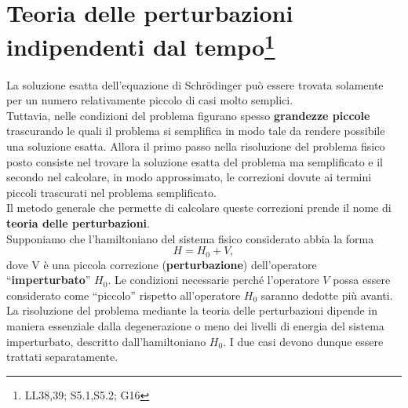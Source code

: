 \chapter[T.d.P. indipendenti dal tempo]{Teoria delle perturbazioni indipendenti dal tempo\footnote{LL38,39; S5.1,S5.2; G16}}
La soluzione esatta dell'equazione di Schr\"{o}dinger può essere trovata solamente per un numero relativamente piccolo di casi molto semplici.\\
Tuttavia, nelle condizioni del problema figurano spesso \textbf{grandezze piccole} trascurando le quali il problema si semplifica in modo tale da rendere possibile una soluzione esatta. Allora il primo passo nella risoluzione del problema fisico posto consiste nel trovare la soluzione esatta del problema ma semplificato e il secondo nel calcolare, in modo approssimato, le correzioni dovute ai termini piccoli trascurati nel problema semplificato.\\
Il metodo generale che permette di calcolare queste correzioni prende il nome di \textbf{teoria delle perturbazioni}.\\
Supponiamo che l'hamiltoniano del sistema fisico considerato abbia la forma
\begin{equation}
H= H_0+ V,
\end{equation}
dove V è una piccola correzione (\textbf{perturbazione}) dell'operatore ``\textbf{imperturbato}'' $H_0$. Le condizioni necessarie perché l'operatore $V$ possa essere considerato come ``piccolo'' rispetto all'operatore $H_0$ saranno dedotte più avanti.\\
La risoluzione del problema mediante la teoria delle perturbazioni dipende in maniera essenziale dalla degenerazione o meno dei livelli di energia del sistema imperturbato, descritto dall'hamiltoniano $H_0$. I due casi devono dunque essere trattati separatamente.
